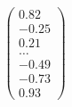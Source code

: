 \documentclass[preview]{standalone}
\begin{document}
\begin{align*}
\begin{pmatrix} 0.82 \\ -0.25 \\ 0.21 \\ \dots \\ -0.49 \\ -0.73 \\ 0.93 \end{pmatrix}
\end{align*}
\end{document}

